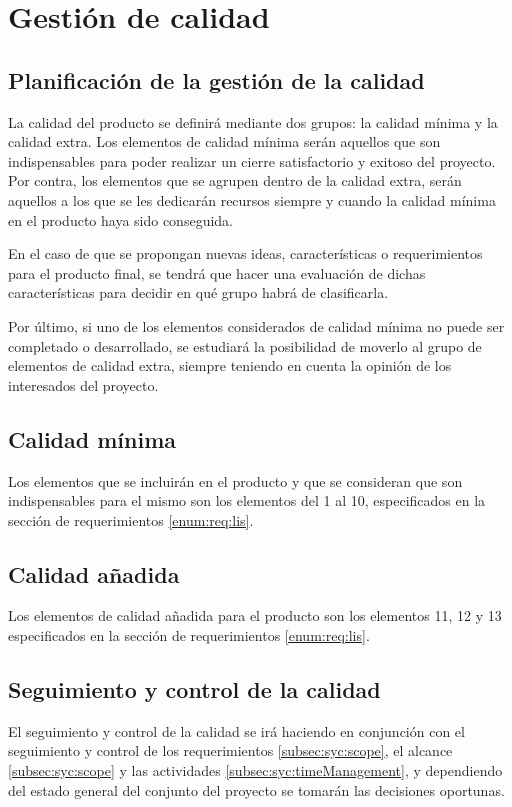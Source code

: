 \section{Gestión de calidad}
\subsection{Planificación de la gestión de la calidad}
La calidad del producto se definirá mediante dos grupos: la calidad
mínima y la calidad extra. Los elementos de calidad mínima serán
aquellos que son indispensables para poder realizar un cierre
satisfactorio y exitoso del proyecto. Por contra, los elementos que se
agrupen dentro de la calidad extra, serán aquellos a los que se les
dedicarán recursos siempre y cuando la calidad mínima en el producto
haya sido conseguida.

En el caso de que se propongan nuevas ideas, características o
requerimientos para el producto final, se tendrá que hacer una
evaluación de dichas características para decidir en qué grupo habrá de
clasificarla.

Por último, si uno de los elementos considerados de calidad mínima no
puede ser completado o desarrollado, se estudiará la posibilidad de
moverlo al grupo de elementos de calidad extra, siempre teniendo en
cuenta la opinión de los interesados del proyecto.

\subsection{Calidad mínima}
Los elementos que se incluirán en el producto y que se consideran que
son indispensables para el mismo son los elementos del 1 al 10, especificados 
en la sección de requerimientos
\ref{enum:req:lis}.

\subsection{Calidad añadida}
Los elementos de calidad añadida para el producto son los elementos 11,
12 y 13 especificados en la sección de requerimientos \ref{enum:req:lis}.

\subsection{Seguimiento y control de la calidad}
El seguimiento y control de la calidad se irá haciendo en conjunción con
el seguimiento y control de los requerimientos \ref{subsec:syc:scope},
el alcance \ref{subsec:syc:scope} y las actividades
\ref{subsec:syc:timeManagement}, y dependiendo del estado general del
conjunto del proyecto se tomarán las decisiones oportunas.
